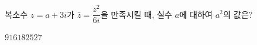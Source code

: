 복소수 $z=a+3i$가 $\bar{z}=\dfrac{z^2}{6i}$을 만족시킬 때, 실수 $a$에 대하여 $a^2$의 값은? 
\begin{choices32}{$9$}{$16$}{$18$}{$25$}{$27$}\end{choices32}
